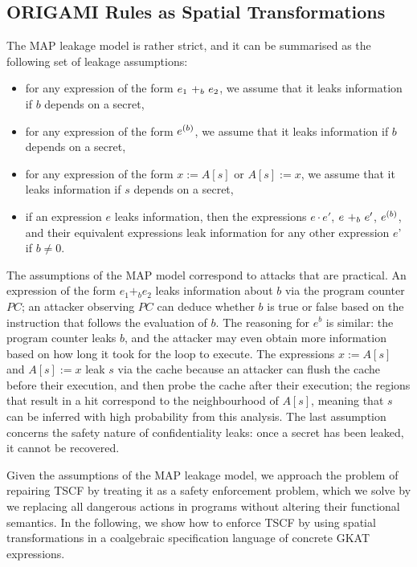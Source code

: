 \subsection{ORIGAMI Rules as Spatial Transformations}
The MAP leakage model is rather strict, and it can be summarised as the following set of leakage assumptions:
\begin{itemize}
    \item for any expression of the form $\branch{b}{e_1}{e_2}$, we assume that it leaks information if $b$ depends on a secret,
    \item for any expression of the form $\iterate{b}{e}$, we assume that it leaks information if $b$ depends on a secret,
    \item for any expression of the form $x:=A[s]$ or $A[s]:=x$, we assume that it leaks information if $s$ depends on a secret,
    \item if an expression $e$ leaks information, then the expressions $e\cdot e'$, $\branch{b}{e}{e'}$, $\iterate{b}{e}$, and their equivalent expressions leak information for any other expression $e$' if $b\neq 0$.
\end{itemize}
The assumptions of the MAP model correspond to attacks that are practical. An expression of the form $e_1 +_b e_2$ leaks information about $b$ via the program counter $PC$; an attacker observing $PC$ can deduce whether $b$ is true or false based on the instruction that follows the evaluation of $b$. The reasoning for $e^b$ is similar: the program counter leaks $b$, and the attacker may even obtain more information based on how long it took for the loop to execute. The expressions $x:=A[s]$ and $A[s]:=x$ leak $s$ via the cache because an attacker can flush the cache before their execution, and then probe the cache after their execution; the regions that result in a hit correspond to the neighbourhood of $A[s]$, meaning that $s$ can be inferred with high probability from this analysis. The last assumption concerns the safety nature of confidentiality leaks: once a secret has been leaked, it cannot be recovered.

Given the assumptions of the MAP leakage model, we approach the problem of repairing TSCF by treating it as a safety enforcement problem, which we solve by  we replacing all dangerous actions in programs without altering their functional semantics. In the following, we show how to enforce TSCF by using spatial transformations in a coalgebraic specification language of concrete GKAT expressions. 


